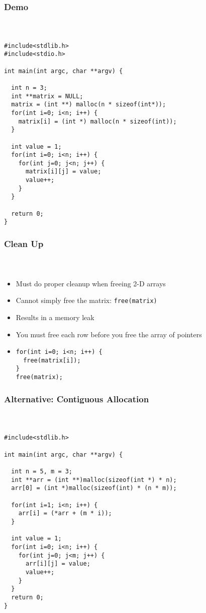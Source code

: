 \documentclass[]{beamer}
\begin{document}
\begin{frame}[fragile]
    \frametitle{Demo}
    \framesubtitle{~}
    

\begin{verbatim}
#include<stdlib.h>
#include<stdio.h>

int main(int argc, char **argv) {

  int n = 3;
  int **matrix = NULL;
  matrix = (int **) malloc(n * sizeof(int*));
  for(int i=0; i<n; i++) {
    matrix[i] = (int *) malloc(n * sizeof(int));
  }

  int value = 1;
  for(int i=0; i<n; i++) {
    for(int j=0; j<n; j++) {
      matrix[i][j] = value;
      value++;
    }
  }

  return 0;
}
\end{verbatim}
\end{frame}

\begin{frame}[fragile]
    \frametitle{Clean Up}
    \framesubtitle{~}

\begin{itemize}[<+->]  
  \item Must do proper cleanup when freeing 2-D arrays
  \item Cannot simply free the matrix:
  \texttt{free(matrix)}
  \item Results in a memory leak
  \item You must free each row before you free the array of pointers
  \item[~]  
\begin{verbatim}
for(int i=0; i<n; i++) {
  free(matrix[i]);
}
free(matrix);
\end{verbatim}
\end{itemize}
  
\end{frame}

\begin{frame}[fragile]
    \frametitle{Alternative: Contiguous Allocation}
    \framesubtitle{~}

\begin{verbatim}
#include<stdlib.h>

int main(int argc, char **argv) {

  int n = 5, m = 3;
  int **arr = (int **)malloc(sizeof(int *) * n);
  arr[0] = (int *)malloc(sizeof(int) * (n * m));

  for(int i=1; i<n; i++) {
    arr[i] = (*arr + (m * i));
  }
  
  int value = 1;
  for(int i=0; i<n; i++) {
    for(int j=0; j<m; j++) {
      arr[i][j] = value;
      value++;
    }
  }
  return 0;
}
\end{verbatim}
\end{frame}
\end{document}
